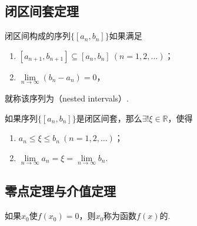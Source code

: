 \subsection{闭区间套定理}
\begin{definition}\label{definition:极限.闭区间套的定义}
闭区间构成的序列\(\{[a_n,b_n]\}\)如果满足
\begin{enumerate}
\item \([a_{n+1},b_{n+1}] \subseteq [a_n,b_n]\ (n=1,2,\dotsc)\)；
\item \(\lim\limits_{n\to\infty} (b_n - a_n) = 0\)，
\end{enumerate}
就称该序列为（nested intervals）.
\end{definition}

\begin{theorem}\label{definition:极限.闭区间套定理}
如果序列\(\{[a_n,b_n]\}\)是闭区间套，那么\(\exists!\xi\in\mathbb{R}\)，使得
\begin{enumerate}
\item \(a_n \leq \xi \leq b_n\ (n=1,2,\dotsc)\)；
\item \(\lim\limits_{n\to\infty} a_n
= \xi
= \lim\limits_{n\to\infty} b_n\).
\end{enumerate}
\end{theorem}

\subsection{零点定理与介值定理}
\begin{definition}
如果\(x_0\)使\(f(x_0) = 0\)，则\(x_0\)称为函数\(f(x)\)的.
\end{definition}

